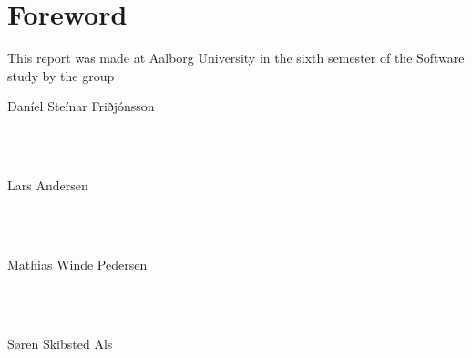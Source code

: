 \chapter*{Foreword}
\noindent This report was made at Aalborg University in the sixth semester of the Software study by the group 

\noindent

\vspace{5mm}
\parbox[h]{4cm}{Daníel Steínar Friðjónsson}\hspace{0.5cm} \makebox[7cm]{\hrulefill} \\ \\
\vspace{5mm}
\parbox[h]{4cm}{Lars Andersen}\hspace{0.5cm} \makebox[7cm]{\hrulefill} \\ \\
\vspace{5mm}
\parbox[h]{4cm}{Mathias Winde Pedersen}\hspace{0.5cm} \makebox[7cm]{\hrulefill} \\ \\
\vspace{5mm}
\parbox[h]{4cm}{S\o ren Skibsted Als}\hspace{0.5cm} \makebox[7cm]{\hrulefill} \\ \\
\newpage